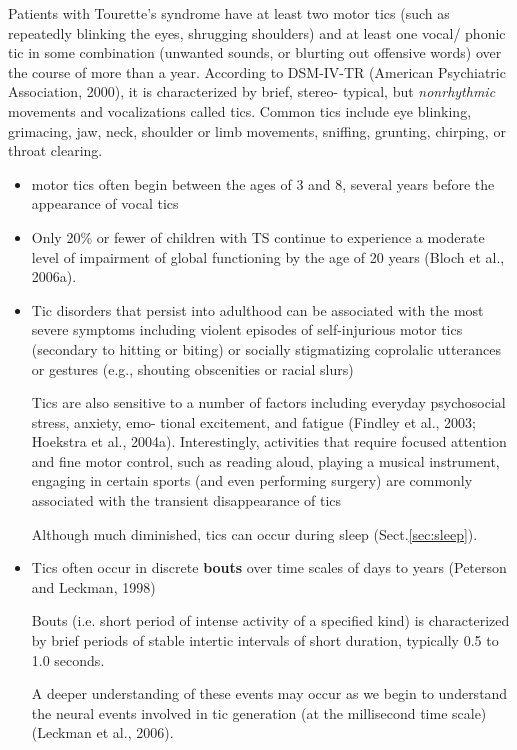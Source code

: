 Patients with  Tourette's syndrome  have at least two motor tics (such as
repeatedly blinking the eyes, shrugging shoulders) and at least one vocal/
phonic tic in some combination (unwanted sounds, or blurting out offensive
words) over the course of more than a year.
According   to DSM-IV-TR (American   Psychiatric Association, 2000), it is
characterized by brief, stereo- typical, but {\it nonrhythmic} movements and
vocalizations called tics. Common tics include eye blinking, grimacing, jaw,
neck, shoulder or limb movements, sniffing, grunting,  chirping,  or  throat 
clearing.
\begin{itemize}
  \item motor tics often begin between the ages
of 3 and 8, several years before the appearance of vocal
tics

  \item Only   20\%   or   fewer   of   children   with   TS
continue to experience a moderate level of impairment
of global functioning by the age of 20 years (Bloch et al., 2006a).

  \item Tic  disorders   that  persist  into
adulthood  can  be  associated  with  the  most  severe symptoms  including 
violent  episodes  of  self-injurious motor tics  (secondary  to  hitting or
biting)  or socially stigmatizing  coprolalic  utterances  or  gestures  (e.g.,
shouting obscenities or racial slurs)

Tics   are   also   sensitive   to   a   number   of   factors
including  everyday  psychosocial  stress,  anxiety,  emo-
tional  excitement,  and  fatigue  (Findley  et  al.,  2003;
Hoekstra  et  al.,  2004a).   
Interestingly,  activities  that require focused attention and fine motor
control, such as   reading   aloud,   playing   a   musical   instrument,
engaging   in   certain   sports   (and   even   performing surgery)  are 
commonly  associated  with  the  transient disappearance of tics

Although  much  diminished,  tics  can  occur  during
sleep (Sect.\ref{sec:sleep}). 
 
  \item Tics often occur in discrete {\bf bouts} over time scales of
days to years (Peterson and Leckman, 1998)

Bouts (i.e. short period of intense activity of a specified kind)
is characterized by brief  periods  of  stable  intertic
intervals of short duration, typically 0.5 to 1.0 seconds.

A deeper understanding of these events may occur  as  we  begin  to  understand 
the  neural  events involved in tic generation (at the millisecond time scale)
(Leckman et al., 2006).



\end{itemize}

